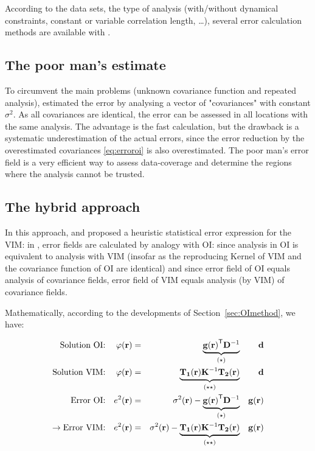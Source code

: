 According to the data sets, the type of analysis (with/without dynamical constraints, constant or variable correlation length, \ldots), several error calculation methods are available with \diva. 

\subsection{The poor man's estimate\label{sec:poormans}}

To circumvent the main problems (unknown covariance function and repeated analysis), \citet{BRASSEUR94} estimated the error by analysing a vector of "covariances" with constant $\sigma^2$. As all covariances are identical, the error can be assessed in all locations with the same analysis. The advantage is the fast calculation, but the drawback is a systematic underestimation of the actual errors, since the error reduction by the overestimated covariances \eqref{eq:erroroi} is also overestimated. The poor man's error field is a very efficient way to assess data-coverage and determine the regions where the analysis cannot be trusted.

\subsection{The hybrid approach}

In this approach, \citet{BRANKART98} and \citet{RIXEN00} proposed a heuristic statistical error expression for the VIM: in \diva, error fields are calculated by analogy with OI: since analysis in OI is equivalent to analysis with VIM (insofar as the reproducing Kernel of VIM and the covariance function of OI are identical) and since error field of OI equals analysis of covariance fields, error field of VIM equals analysis (by VIM) of covariance fields.

Mathematically, according to the developments of Section~\ref{sec:OImethod}, we have:

\begin{align}
\textrm{Solution OI:} 	&	& \varphi(\mathbf{r}) &=& \underbrace{\mathbf{g}{(\mathbf{r})}^\mathsf{T}\mathbf{D}^{-1}}_{(\star)}		&& \mathbf{d}\\
\textrm{Solution VIM:}	&	& \varphi(\mathbf{r}) &=& \underbrace{\mathbf{T_{1}}(\mathbf{r})\mathbf{K}^{-1} \mathbf{T_{2}}(\mathbf{r})}_{(\star\star)} 																								&&\mathbf{d}\\
\textrm{Error~OI:}  	& 	& e^{2}(\mathbf{r})   &=& \sigma^{2}(\mathbf{r})-\underbrace{\mathbf{g}{(\mathbf{r})}^\mathsf{T}\mathbf{D}^{-1}}_{(\star)}														&&\mathbf{g}(\mathbf{r})	\\		
\rightarrow \textrm{Error~VIM:}		& 	& e^{2}(\mathbf{r})   &=& \sigma^{2}(\mathbf{r})-\underbrace{\mathbf{T_{1}}(\mathbf{r})\mathbf{K}^{-1} \mathbf{T_{2}}(\mathbf{r})}_{(\star\star)}		&&\mathbf{g}(\mathbf{r})
\end{align}

